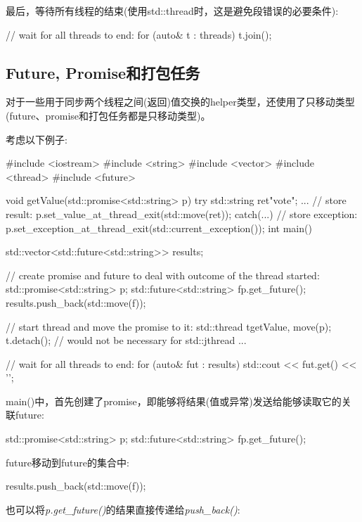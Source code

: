 最后，等待所有线程的结束(使用std::thread时，这是避免段错误的必要条件):

\begin{cppcode}
// wait for all threads to end:
for (auto& t : threads) {
	t.join();
}
\end{cppcode}

\subsection{Future, Promise和打包任务}

对于一些用于同步两个线程之间(返回)值交换的helper类型，还使用了只移动类型(future、promise和打包任务都是只移动类型)。

考虑以下例子:

\begin{cppcode}
#include <iostream>
#include <string>
#include <vector>
#include <thread>
#include <future>

void getValue(std::promise<std::string> p)
{
	try {
		std::string ret{"vote"};
		...
		// store result:
		p.set_value_at_thread_exit(std::move(ret));
	}
	catch(...) {
		// store exception:
		p.set_exception_at_thread_exit(std::current_exception());
	}
}
int main()
{
	std::vector<std::future<std::string>> results;
	
	// create promise and future to deal with outcome of the thread started:
	std::promise<std::string> p;
	std::future<std::string> f{p.get_future()};
	results.push_back(std::move(f));
	
	// start thread and move the promise to it:
	std::thread t{getValue, move(p)};
	t.detach(); // would not be necessary for std::jthread
	...
	
	// wait for all threads to end:
	for (auto& fut : results) {
		std::cout << fut.get() << '\n';
	}
}
\end{cppcode}

main()中，首先创建了promise，即能够将结果(值或异常)发送给能够读取它的关联future:

\begin{cppcode}
std::promise<std::string> p;
std::future<std::string> f{p.get_future()};
\end{cppcode}

future移动到future的集合中:

\begin{cppcode}
results.push_back(std::move(f));
\end{cppcode}

也可以将\textit{p.get_future()}的结果直接传递给\textit{push_back()}:

